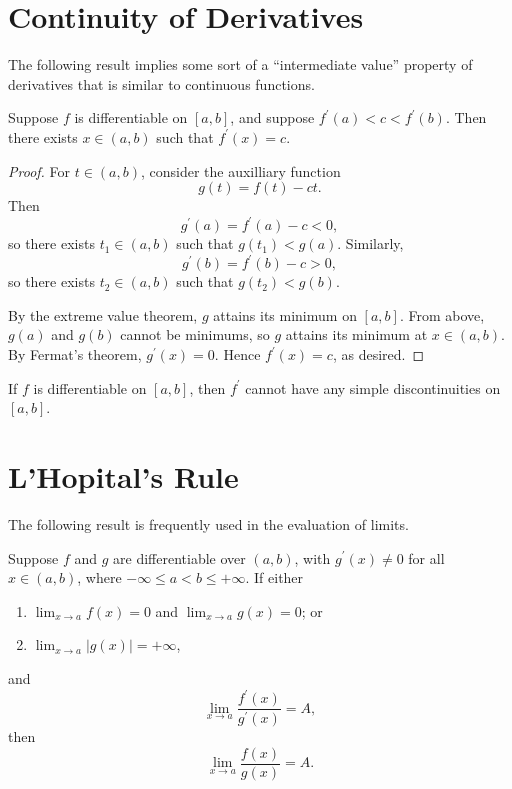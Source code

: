 \section{Continuity of Derivatives}
The following result implies some sort of a ``intermediate value'' property of derivatives that is similar to continuous functions.

\begin{theorem}
Suppose $f$ is differentiable on $[a,b]$, and suppose $f^\prime(a)<c<f^\prime(b)$. Then there exists $x\in(a,b)$ such that $f^\prime(x)=c$.
\end{theorem}

\begin{proof}
For $t\in(a,b)$, consider the auxilliary function
\[g(t)=f(t)-ct.\]
Then
\[g^\prime(a)=f^\prime(a)-c<0,\]
so there exists $t_1\in(a,b)$ such that $g(t_1)<g(a)$. Similarly,
\[g^\prime(b)=f^\prime(b)-c>0,\]
so there exists $t_2\in(a,b)$ such that $g(t_2)<g(b)$.

By the extreme value theorem, $g$ attains its minimum on $[a,b]$. From above, $g(a)$ and $g(b)$ cannot be minimums, so $g$ attains its minimum at $x\in(a,b)$. By Fermat's theorem, $g^\prime(x)=0$. Hence $f^\prime(x)=c$, as desired.
\end{proof}

\begin{corollary}
If $f$ is differentiable on $[a,b]$, then $f^\prime$ cannot have any simple discontinuities on $[a,b]$.
\end{corollary}
\pagebreak

\section{L'Hopital's Rule}
The following result is frequently used in the evaluation of limits.
\begin{lemma}
Suppose $f$ and $g$ are differentiable over $(a,b)$, with $g^\prime(x)\neq0$ for all $x\in(a,b)$, where $-\infty\le a<b\le+\infty$. If either
\begin{enumerate}[label=(\roman*)]
\item $\displaystyle\lim_{x\to a}f(x)=0$ and $\displaystyle\lim_{x\to a}g(x)=0$; or
\item $\displaystyle\lim_{x\to a}|g(x)|=+\infty$,
\end{enumerate}
and
\[\lim_{x\to a}\frac{f^\prime(x)}{g^\prime(x)}=A,\]
then
\[\lim_{x\to a}\frac{f(x)}{g(x)}=A.\]
\end{lemma}

